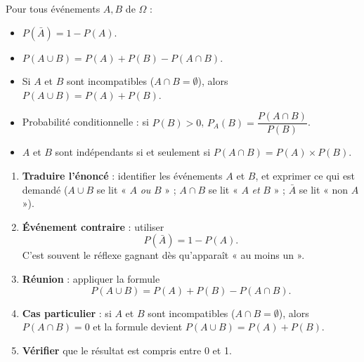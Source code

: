 \documentclass[11pt]{article}
\newcommand{\cle}[1]{{\popxbold\color{popdark}#1}}
\begin{document}
\begin{propriete}
Pour tous événements $A, B$ de $\Omega$ :
\begin{itemize}
\item $P(\bar{A}) = 1 - P(A)$.
\item $P(A \cup B) = P(A) + P(B) - P(A \cap B)$.
\item Si $A$ et $B$ sont incompatibles ($A \cap B = \emptyset$), alors $P(A \cup B) = P(A) + P(B)$.
\item Probabilité conditionnelle : si $P(B) > 0$, $P_A(B) = \dfrac{P(A \cap B)}{P(B)}$.
\item $A$ et $B$ sont \cle{indépendants} si et seulement si $P(A \cap B) = P(A) \times P(B)$.
\end{itemize}
\end{propriete}

\begin{methode}
\begin{enumerate}
\item \textbf{Traduire l'énoncé} : identifier les événements $A$ et $B$, et exprimer ce qui est demandé ($A \cup B$ se lit « $A$ \emph{ou} $B$ » ; $A \cap B$ se lit « $A$ \emph{et} $B$ » ; $\bar{A}$ se lit « non $A$ »).
\item \textbf{Événement contraire} : utiliser
\[ P(\bar{A}) = 1 - P(A). \]
C'est souvent le réflexe gagnant dès qu'apparaît « au moins un ».
\item \textbf{Réunion} : appliquer la formule
\[ P(A \cup B) = P(A) + P(B) - P(A \cap B). \]
\item \textbf{Cas particulier} : si $A$ et $B$ sont \cle{incompatibles} ($A \cap B = \emptyset$), alors $P(A \cap B) = 0$ et la formule devient $P(A \cup B) = P(A) + P(B)$.
\item \textbf{Vérifier} que le résultat est compris entre 0 et 1.
\end{enumerate}
\end{methode}
\end{document}
